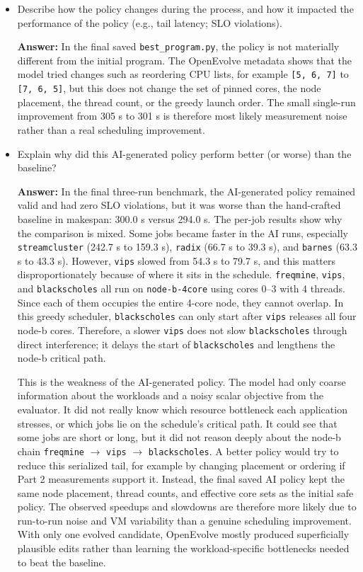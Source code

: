 \begin{enumerate}
\begin{enumerate}
\begin{itemize}
            \item Describe how the policy changes during the process, and how it impacted the performance of the policy (e.g., tail latency; SLO violations).

            \textbf{Answer:} In the final saved \texttt{best\_program.py}, the policy is not materially different from the initial program. The OpenEvolve metadata shows that the model tried changes such as reordering CPU lists, for example \texttt{[5, 6, 7]} to \texttt{[7, 6, 5]}, but this does not change the set of pinned cores, the node placement, the thread count, or the greedy launch order. The small single-run improvement from 305 s to 301 s is therefore most likely measurement noise rather than a real scheduling improvement.

            \item Explain why did this AI-generated policy perform better (or worse) than the baseline?

            \textbf{Answer:} In the final three-run benchmark, the AI-generated policy remained valid and had zero SLO violations, but it was worse than the hand-crafted baseline in makespan: 300.0 s versus 294.0 s. The per-job results show why the comparison is mixed. Some jobs became faster in the AI runs, especially \texttt{streamcluster} (242.7 s to 159.3 s), \texttt{radix} (66.7 s to 39.3 s), and \texttt{barnes} (63.3 s to 43.3 s). However, \texttt{vips} slowed from 54.3 s to 79.7 s, and this matters disproportionately because of where it sits in the schedule. \texttt{freqmine}, \texttt{vips}, and \texttt{blackscholes} all run on \texttt{node-b-4core} using cores 0--3 with 4 threads. Since each of them occupies the entire 4-core node, they cannot overlap. In this greedy scheduler, \texttt{blackscholes} can only start after \texttt{vips} releases all four node-b cores. Therefore, a slower \texttt{vips} does not slow \texttt{blackscholes} through direct interference; it delays the start of \texttt{blackscholes} and lengthens the node-b critical path.

            This is the weakness of the AI-generated policy. The model had only coarse information about the workloads and a noisy scalar objective from the evaluator. It did not really know which resource bottleneck each application stresses, or which jobs lie on the schedule's critical path. It could see that some jobs are short or long, but it did not reason deeply about the node-b chain \texttt{freqmine} $\rightarrow$ \texttt{vips} $\rightarrow$ \texttt{blackscholes}. A better policy would try to reduce this serialized tail, for example by changing placement or ordering if Part 2 measurements support it. Instead, the final saved AI policy kept the same node placement, thread counts, and effective core sets as the initial safe policy. The observed speedups and slowdowns are therefore more likely due to run-to-run noise and VM variability than a genuine scheduling improvement. With only one evolved candidate, OpenEvolve mostly produced superficially plausible edits rather than learning the workload-specific bottlenecks needed to beat the baseline.


\end{itemize}
\end{enumerate}
\end{enumerate}
